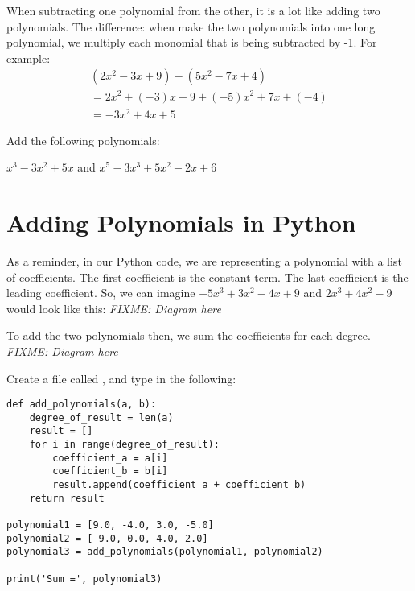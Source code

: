When subtracting one polynomial from the other, it is a lot like
adding two polynomials. The difference: when make the two polynomials
into one long polynomial, we multiply each monomial that is being
subtracted by -1. For example:
\begin{multline*}
  (2x^2 - 3x + 9) - (5x^2 - 7x + 4) \\
  = 2x^2 + (-3)x + 9 + (-5)x^2 +7x + (-4) \\
  = -3x^2 + 4x + 5
\end{multline*}

\begin{Exercise}[title=Subtracting Polynomials Practice, label=subtractpns]
  Add the following polynomials:
  \vspace{20mm}
  \vspace{20mm}
\end{Exercise}
\begin{Answer}[ref=subtractpns]$x^3 - 3x^2 + 5x$ and $x^5 - 3x^3 + 5x^2 - 2x + 6$\end{Answer}

\section{Adding Polynomials in Python}

As a reminder, in our Python code, we are representing a polynomial
with a list of coefficients.  The first coefficient is the constant
term. The last coefficient is the leading coefficient. So, we can
imagine $-5x^3 + 3x^2 - 4x + 9$ and $2x^3 +4x^2 - 9$ would look
like this: \textit{FIXME: Diagram here}

To add the two polynomials then, we sum the coefficients for each degree.
\textit{FIXME: Diagram here}

Create a file called , and type in the following: 
\begin{Verbatim}
def add_polynomials(a, b):
    degree_of_result = len(a)
    result = []
    for i in range(degree_of_result):
        coefficient_a = a[i]
        coefficient_b = b[i]
        result.append(coefficient_a + coefficient_b)
    return result

polynomial1 = [9.0, -4.0, 3.0, -5.0]
polynomial2 = [-9.0, 0.0, 4.0, 2.0]
polynomial3 = add_polynomials(polynomial1, polynomial2)

print('Sum =', polynomial3)
\end{Verbatim}

